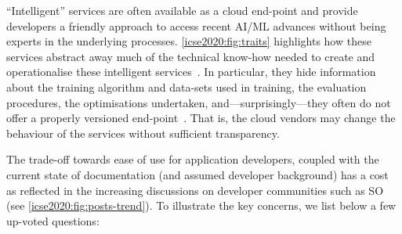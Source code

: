 ``Intelligent'' services are often available as a cloud end-point and provide developers a friendly approach to access recent AI/ML advances without being experts in the underlying processes. \cref{icse2020:fig:traits} highlights how these services abstract away much of the technical know-how needed to create and operationalise these intelligent services~\citep{Ortiz:2017wg}. In particular, they hide information about the training algorithm and data-sets used in training, the evaluation procedures, the optimisations undertaken, and---surprisingly---they often do not offer a properly versioned end-point~\citep{Cummaudo:2019icsme, Ohtake:2019vi}. That is, the cloud vendors may change the behaviour of the services without sufficient transparency.

The trade-off towards ease of use for application developers, coupled with the current state of documentation (and assumed developer background) has a cost as reflected in the increasing discussions on developer communities such as SO (see \cref{icse2020:fig:posts-trend}). To illustrate the key concerns, we list below a few up-voted questions:

